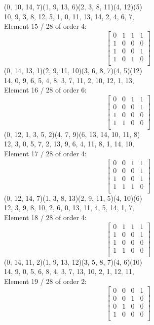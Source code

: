 (0, 10, 14, 7)(1, 9, 13, 6)(2, 3, 8, 11)(4, 12)(5)\\
10, 9, 3, 8, 12, 5, 1, 0, 11, 13, 14, 2, 4, 6, 7, \\
Element    15 / 28 of order 4:
$$
\left[
\begin{array}{*{4}{r}}
0 & 1 & 1 & 1\\
1 & 0 & 0 & 0\\
1 & 0 & 0 & 1\\
1 & 0 & 1 & 0\\
\end{array}
\right]
$$
(0, 14, 13, 1)(2, 9, 11, 10)(3, 6, 8, 7)(4, 5)(12)\\
14, 0, 9, 6, 5, 4, 8, 3, 7, 11, 2, 10, 12, 1, 13, \\
Element    16 / 28 of order 6:
$$
\left[
\begin{array}{*{4}{r}}
0 & 0 & 1 & 1\\
0 & 0 & 0 & 1\\
1 & 0 & 0 & 0\\
1 & 1 & 0 & 0\\
\end{array}
\right]
$$
(0, 12, 1, 3, 5, 2)(4, 7, 9)(6, 13, 14, 10, 11, 8)\\
12, 3, 0, 5, 7, 2, 13, 9, 6, 4, 11, 8, 1, 14, 10, \\
Element    17 / 28 of order 4:
$$
\left[
\begin{array}{*{4}{r}}
0 & 0 & 1 & 1\\
0 & 0 & 0 & 1\\
1 & 0 & 0 & 1\\
1 & 1 & 1 & 0\\
\end{array}
\right]
$$
(0, 12, 14, 7)(1, 3, 8, 13)(2, 9, 11, 5)(4, 10)(6)\\
12, 3, 9, 8, 10, 2, 6, 0, 13, 11, 4, 5, 14, 1, 7, \\
Element    18 / 28 of order 4:
$$
\left[
\begin{array}{*{4}{r}}
0 & 1 & 1 & 1\\
1 & 0 & 0 & 1\\
1 & 0 & 0 & 0\\
1 & 1 & 0 & 0\\
\end{array}
\right]
$$
(0, 14, 11, 2)(1, 9, 13, 12)(3, 5, 8, 7)(4, 6)(10)\\
14, 9, 0, 5, 6, 8, 4, 3, 7, 13, 10, 2, 1, 12, 11, \\
Element    19 / 28 of order 2:
$$
\left[
\begin{array}{*{4}{r}}
0 & 0 & 0 & 1\\
0 & 0 & 1 & 0\\
0 & 1 & 0 & 0\\
1 & 0 & 0 & 0\\
\end{array}
\right]
$$
